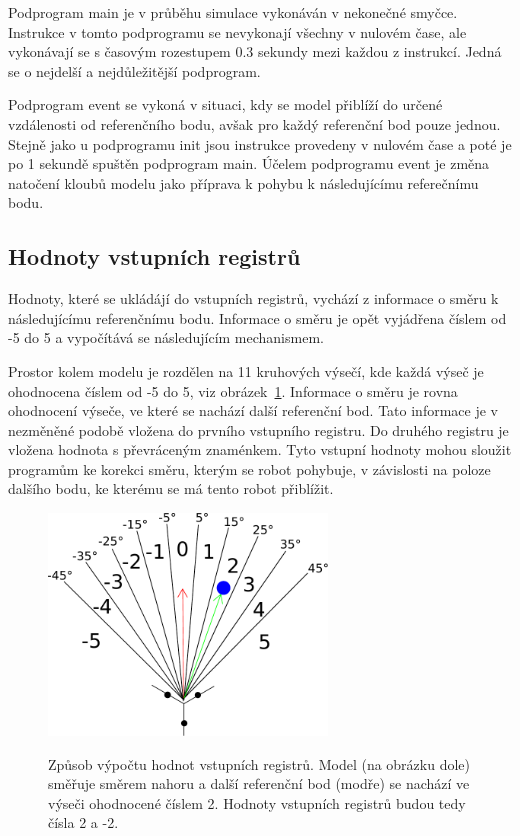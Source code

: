Podprogram main je v průběhu simulace vykonáván v nekonečné smyčce.
Instrukce v tomto podprogramu se nevykonají všechny v nulovém čase, ale vykonávají se s časovým rozestupem 0.3 sekundy mezi každou z instrukcí.
Jedná se o nejdelší a nejdůležitější podprogram.

Podprogram event se vykoná v situaci, kdy se model přiblíží do určené vzdálenosti od referenčního bodu, avšak pro každý referenční bod pouze jednou.
Stejně jako u podprogramu init jsou instrukce provedeny v nulovém čase a poté je po 1 sekundě spuštěn podprogram main.
Účelem podprogramu event je změna natočení kloubů modelu jako příprava k pohybu k následujícímu referečnímu bodu.

\subsection{Hodnoty vstupních registrů}
Hodnoty, které se ukládájí do vstupních registrů, vychází z informace o směru k následujícímu referenčnímu bodu.
Informace o směru je opět vyjádřena číslem od -5 do 5 a vypočítává se následujícím mechanismem.

Prostor kolem modelu je rozdělen na 11 kruhových výsečí, kde každá výseč je ohodnocena číslem od -5 do 5, viz obrázek~\ref{fig:kruhove_vysece}.
Informace o směru je rovna ohodnocení výseče, ve které se nachází další referenční bod.
Tato informace je v nezměněné podobě vložena do prvního vstupního registru.
Do druhého registru je vložena hodnota s převráceným znaménkem.
Tyto vstupní hodnoty mohou sloužit programům ke korekci směru, kterým se robot pohybuje, v závislosti na poloze dalšího bodu, ke kterému se má tento robot přiblížit.


\begin{figure}[h]
    \centering
    {\includegraphics[width=20em]{obrazky/reference_direction_angles.pdf}}
    \caption{
    Způsob výpočtu hodnot vstupních registrů.
    Model (na obrázku dole) směřuje směrem nahoru a další referenční bod (modře) se nachází ve výseči ohodnocené číslem 2.
    Hodnoty vstupních registrů budou tedy čísla 2 a -2.
    }
    \label{fig:kruhove_vysece}
\end{figure}

